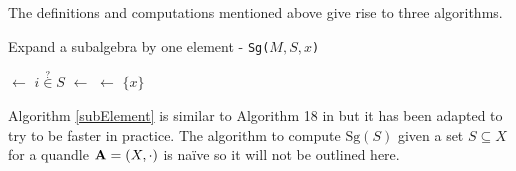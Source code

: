 \documentclass{mcom-l}
\begin{document}
The definitions and computations mentioned above give rise to three algorithms.\newline
\begin{algorithm}[H]
\label{subElement}
\DontPrintSemicolon
\caption{Expand a subalgebra by one element - \texttt{Sg($M,S,x$)}}

\BlankLine
\BlankLine
{} $\leftarrow$ $i \overset{?}{\in} S$\;
 $\leftarrow$ \true\;
\toAdd $\leftarrow$ $\{x\}$\;

\end{algorithm}
\noindent Algorithm \ref{subElement} is similar to Algorithm 18 in \cite{Araujo2022CREAMAP} but it has been adapted to try to be faster in practice.\newline
The algorithm to compute $\text{Sg}(S)$ given a set $S \subseteq X$ for a quandle $\mathbf{A} = (X, \cdot)$ is naïve so it will not be outlined here. 
\end{document}
